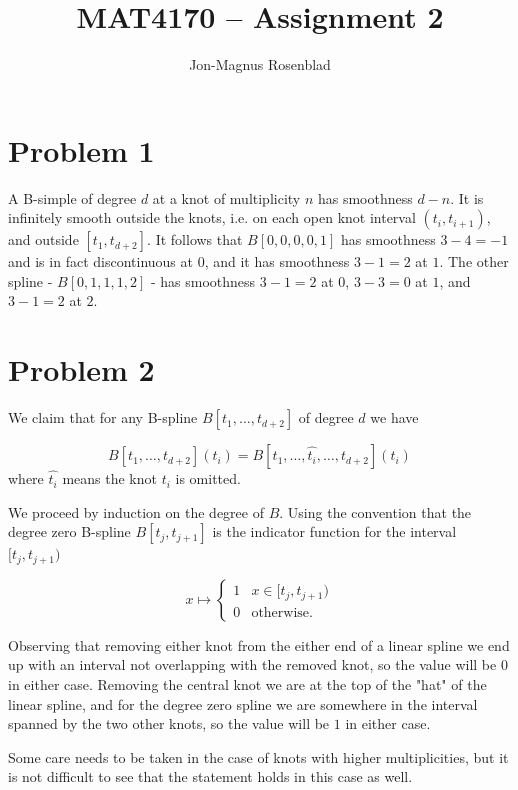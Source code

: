 \documentclass{article}
\title{MAT4170 -- Assignment 2}
\author{Jon-Magnus Rosenblad}
\date{}
\begin{document}
\maketitle

\section*{Problem 1}
A B-simple of degree $d$ at a knot of multiplicity $n$ has smoothness $d - n$.
It is infinitely smooth outside the knots, i.e. on each open knot interval $(t_i,t_{i + 1})$,
and outside $[t_1, t_{d + 2}]$.
It follows that $B[0,0,0,0,1]$ has smoothness $3 - 4=-1$ and is in fact discontinuous at $0$,
and it has smoothness $3 - 1 = 2$ at $1$.
The other spline - $B[0,1,1,1,2]$ - has smoothness $3 - 1 = 2$ at $0$, $3 - 3 = 0$ at $1$, and $3 - 1 = 2$ at $2$.

\section*{Problem 2}

We claim that for any B-spline $B[t_1,\ldots,t_{d + 2}]$ of degree $d$
we have 

\begin{equation}
    B[t_1,\ldots, t_{d + 2}](t_i) = B[t_1,\ldots,\hat{t_i},\ldots,t_{d + 2}](t_i)
\end{equation}
where $\hat{t_i}$ means the knot $t_i$ is omitted.

We proceed by induction on the degree of $B$.
Using the convention that the degree zero B-spline $B[t_j,t_{j + 1}]$
is the indicator function for the interval $[t_j,t_{j + 1})$

\begin{equation}
    x\mapsto \begin{cases}
        1   &x\in [t_j, t_{j + 1})\\
        0   &\textrm{otherwise}.
    \end{cases}
\end{equation}

Observing that removing either knot from the either end of a linear spline
we end up with an interval not overlapping with the removed knot,
so the value will be $0$ in either case.
Removing the central knot we are at the top of the "hat" of the linear spline,
and for the degree zero spline we are somewhere in the interval spanned by the two other knots,
so the value will be $1$ in either case.

Some care needs to be taken in the case of knots with higher multiplicities,
but it is not difficult to see that the statement holds in this case as well.
\end{document}

